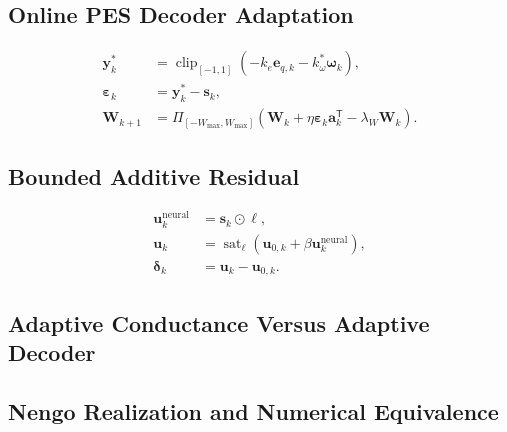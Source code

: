 \documentclass[letterpaper,10pt,conference]{ieeeconf}
\newcommand{\T}{^{\mathsf T}}
\newcommand{\sat}{\operatorname{sat}}
\newcommand{\clip}{\operatorname{clip}}
\begin{document}
\subsection{Online PES Decoder Adaptation}

\begin{align}
    \bm y_k^* &= \clip_{[-1,1]}
        (-k_e\bm e_{q,k}-k_\omega^*\bm\omega_k), \\
    \bm\varepsilon_k &= \bm y_k^*-\bm s_k, \\
    \bm W_{k+1} &= \Pi_{[-W_{\max},W_{\max}]}
    \left(\bm W_k+\eta\bm\varepsilon_k\bm a_k\T
    -\lambda_W\bm W_k\right).
\end{align}


\subsection{Bounded Additive Residual}

\begin{align}
    \bm u_k^{\mathrm{neural}} &= \bm s_k\odot\bm\ell, \\
    \bm u_k &= \sat_{\bm\ell}
        \left(\bm u_{0,k}+\beta\bm u_k^{\mathrm{neural}}\right), \\
    \bm\delta_k &= \bm u_k-\bm u_{0,k}.
\end{align}


\subsection{Adaptive Conductance Versus Adaptive Decoder}


\subsection{Nengo Realization and Numerical Equivalence}

\end{document}
